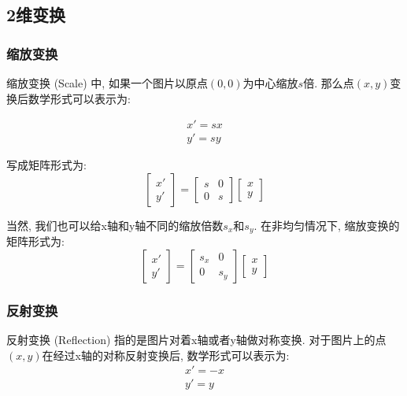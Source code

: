 \documentclass[openany]{progbookcn}
\begin{document}
\subsection{2维变换}

\subsubsection{缩放变换}

缩放变换 (Scale) 中, 如果一个图片以原点$(0,0)$为中心缩放$s$倍. 那么点$(x,y)$变换后数学形式可以表示为: 

\begin{equation}
\begin{split}
	x'=sx
	\\
	y'=sy
\end{split}
\end{equation}

写成矩阵形式为: 
\begin{equation}
	\begin{bmatrix}
		x' \\
		y'
	\end{bmatrix} = \begin{bmatrix}
		s&0\\0&s\end{bmatrix}\begin{bmatrix}x\\y\end{bmatrix}
\end{equation}

当然, 我们也可以给x轴和y轴不同的缩放倍数$s_x$和$s_y$. 在非均匀情况下, 缩放变换的矩阵形式为: 
\begin{equation}
	\begin{bmatrix}
		x' \\
		y'
	\end{bmatrix} = \begin{bmatrix}
		s_x&0\\0&s_y\end{bmatrix}\begin{bmatrix}x\\y\end{bmatrix}
\end{equation}

\subsubsection{反射变换}

反射变换 (Reflection) 指的是图片对着x轴或者y轴做对称变换. 对于图片上的点$(x,y)$在经过x轴的对称反射变换后, 数学形式可以表示为: 
\begin{equation}
	\begin{split}
		x'=-x\\y'=y
	\end{split}
\end{equation}
\end{document}
